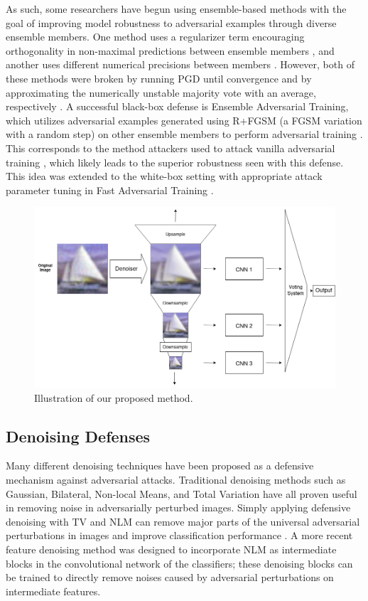 \documentclass[10pt,journal,compsoc]{IEEEtran}
\begin{document}
As such, some researchers have begun using ensemble-based methods with the goal of improving model robustness to adversarial examples through diverse ensemble members. One method uses a regularizer term encouraging orthogonality in non-maximal predictions between ensemble members \cite{diversity}, and another uses different numerical precisions between members \cite{empir}. However, both of these methods were broken by running PGD until convergence and by approximating the numerically unstable majority vote with an average, respectively \cite{survey}. A successful black-box defense is Ensemble Adversarial Training, which utilizes adversarial examples generated using R+FGSM (a FGSM variation with a random step) on other ensemble members to perform adversarial training \cite{eat}. This corresponds to the method attackers used to attack vanilla adversarial training \cite{pbba}, which likely leads to the superior robustness seen with this defense. This idea was extended to the white-box setting with appropriate attack parameter tuning in Fast Adversarial Training \cite{fat}.


\begin{figure}[!t]
\centering
    \includegraphics[scale=0.25]{images/diagram.png}
    \caption{Illustration of our proposed method.}
    \label{fig:diagram}
\end{figure}

\subsection{Denoising Defenses}
Many different denoising techniques have been proposed as a defensive mechanism against adversarial attacks. Traditional denoising methods such as Gaussian, Bilateral, Non-local Means, and Total Variation have all proven useful in removing noise in adversarially perturbed images. Simply applying defensive denoising with TV and NLM can remove major parts of the universal adversarial perturbations in images and improve classification performance \cite{cite11}. A more recent feature denoising \cite{cite12} method  was designed to incorporate NLM as intermediate blocks in the convolutional network of the classifiers; these denoising blocks can be trained to directly remove noises caused by adversarial perturbations on intermediate features.
\end{document}
